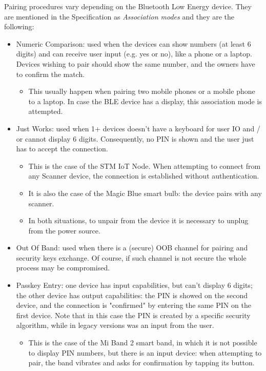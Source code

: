 Pairing procedures vary depending on the Bluetooth Low Energy device. They are mentioned in the Specification as \textit{Association modes} and they are the following:
\begin{itemize}
	\item Numeric Comparison: used when the devices can show numbers (at least 6 digits) and can receive user input (e.g. yes or no), like a phone or a laptop. Devices wishing to pair should show the same number, and the owners have to confirm the match.
	\begin{itemize}
		\item This usually happen when pairing two mobile phones or a mobile phone to a laptop. In case the BLE device has a display, this association mode is attempted.
	\end{itemize}
	\item Just Works: used when 1+ devices doesn't have a keyboard for user IO and / or cannot display 6 digits. Consequently, no PIN is shown and the user just has to accept the connection.
	\begin{itemize}
		\item This is the case of the STM IoT Node. When attempting to connect from any Scanner device, the connection is established without authentication.
		\item It is also the case of the Magic Blue smart bulb: the device pairs with any scanner.
		\item In both situations, to unpair from the device it is necessary to unplug from the power source.
	\end{itemize}
	\item Out Of Band: used when there is a (secure) OOB channel for pairing and security keys exchange. Of course, if such channel is not secure the whole process may be compromised.
	\item Passkey Entry: one device has input capabilities, but can't display 6 digits; the other device has output capabilities: the PIN is showed on the second device, and the connection is "confirmed" by entering the same PIN on the first device. Note that in this case the PIN is created by a specific security algorithm, while in legacy versions was an input from the user.
	\begin{itemize}
		\item This is the case of the Mi Band 2 smart band, in which it is not possible to display PIN numbers, but there is an input device: when attempting to pair, the band vibrates and asks for confirmation by tapping its button.
	\end{itemize}
\end{itemize}

